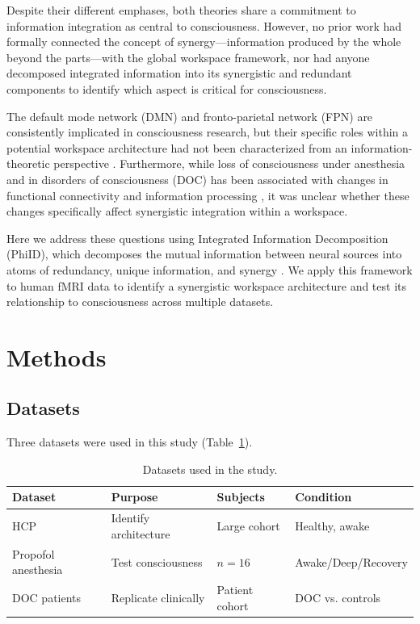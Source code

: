 \documentclass[11pt]{article}
\begin{document}
Despite their different emphases, both theories share a commitment to information integration as central to consciousness. However, no prior work had formally connected the concept of synergy---information produced by the whole beyond the parts---with the global workspace framework, nor had anyone decomposed integrated information into its synergistic and redundant components to identify which aspect is critical for consciousness.

The default mode network (DMN) and fronto-parietal network (FPN) are consistently implicated in consciousness research, but their specific roles within a potential workspace architecture had not been characterized from an information-theoretic perspective \citep{raichle2001default, cole2013multi}. Furthermore, while loss of consciousness under anesthesia and in disorders of consciousness (DOC) has been associated with changes in functional connectivity and information processing \citep{mashour2020recovery, laureys2004brain}, it was unclear whether these changes specifically affect synergistic integration within a workspace.

Here we address these questions using Integrated Information Decomposition (PhiID), which decomposes the mutual information between neural sources into atoms of redundancy, unique information, and synergy \citep{mediano2021towards}. We apply this framework to human fMRI data to identify a synergistic workspace architecture and test its relationship to consciousness across multiple datasets.

\section{Methods}

\subsection{Datasets}

Three datasets were used in this study (Table~\ref{tab:datasets}).

\begin{table}[htbp]
\centering
\caption{Datasets used in the study.}
\label{tab:datasets}
\begin{tabular}{llll}
\toprule
Dataset & Purpose & Subjects & Condition \\
\midrule
HCP & Identify architecture & Large cohort & Healthy, awake \\
Propofol anesthesia & Test consciousness & $n = 16$ & Awake/Deep/Recovery \\
DOC patients & Replicate clinically & Patient cohort & DOC vs. controls \\
\bottomrule
\end{tabular}
\end{table}
\end{document}
